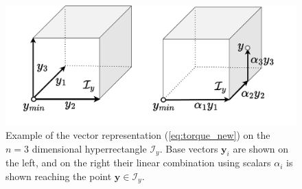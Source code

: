 \begin{figure}
\vspace{-1.6cm}
    \centering
    \includegraphics[width=\linewidth]{Papers/images/navigation_y.pdf}
    \caption{Example of the vector representation (\ref{eq:torque_new}) on the $n\!=\!3$ dimensional hyperrectangle $\mathcal{I}_y$. Base vectors $\bm{y}_i$ are shown on the left, and on the right their linear combination using scalars $\alpha_i$ is shown reaching the point $\bm{y}\in\mathcal{I}_y$.}
    \label{fig:navigation_y}
\end{figure}

